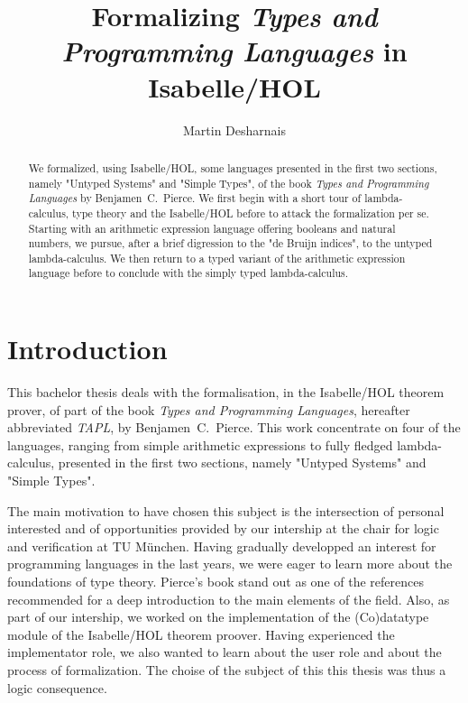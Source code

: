 \documentclass[a4paper, oneside, 12pt, titlepage]{article}
\begin{document}
\title{Formalizing \emph{Types and Programming Languages} in Isabelle/HOL}
\author{Martin Desharnais}
\maketitle

\begin{abstract}
We formalized, using Isabelle/HOL, some languages presented in the first two sections, namely
"Untyped Systems" and "Simple Types", of the book \emph{Types and Programming Languages} by
Benjamen~C.~Pierce. We first begin with a short tour of lambda-calculus, type theory and the
Isabelle/HOL before to attack the formalization per se. Starting with an arithmetic expression
language offering booleans and natural numbers, we pursue, after a brief digression to the "de
Bruijn indices", to the untyped lambda-calculus. We then return to a typed variant of the arithmetic
expression language before to conclude with the simply typed lambda-calculus.
\end{abstract}

\tableofcontents
\newpage

\section{Introduction}

This bachelor thesis deals with the formalisation, in the Isabelle/HOL theorem prover, of part of
the book \emph{Types and Programming Languages}, hereafter abbreviated \emph{TAPL}, by
Benjamen~C.~Pierce. This work concentrate on four of the languages, ranging from simple arithmetic
expressions to fully fledged lambda-calculus, presented in the first two sections, namely "Untyped
Systems" and "Simple Types".

The main motivation to have chosen this subject is the intersection of personal interested and of
opportunities provided by our intership at the chair for logic and verification at TU München.
Having gradually developped an interest for programming languages in the last years, we were
eager to learn more about the foundations of type theory. Pierce's book stand out as one of the
references recommended for a deep introduction to the main elements of the field. Also, as part of
our intership, we worked on the implementation of the (Co)datatype module of the Isabelle/HOL
theorem proover. Having experienced the implementator role, we also wanted to learn about the user
role and about the process of formalization. The choise of the subject of this this thesis was thus
a logic consequence.
\end{document}
